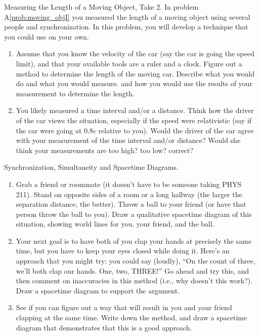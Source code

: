 \begin{aproblem}{Measuring the Length of a Moving Object, Take 2.}
  In problem A\ref{prob:moving_objI} you measured the length of a
  moving object using several people and synchronization.  In this
  problem, you will develop a technique that you could use on your
  own.
  \begin{enumerate}
  \item Assume that you know the velocity of the car (say the car is
    going the speed limit), and that your available tools are a ruler
    and a clock.  Figure out a method to determine the length of the
    moving car.  Describe what you would do and what you would
    measure. and how you would use the results of your measurement to
    determine the length.

  \item You likely measured a time interval and/or a distance.  Think
    how the driver of the car views the situation, especially if the
    speed were relativistic (say if the car were going at $0.8c$
    relative to you).  Would the driver of the car agree with your
    measurement of the time interval and/or distance?  Would she think
    your measurements are too high?  too low?  correct?

  \end{enumerate}
\end{aproblem}

\begin{aproblem}{Synchronization, Simultaneity and Spacetime Diagrams.}
  \begin{enumerate}
  \item Grab a friend or roommate (it doesn't have to be someone
    taking PHYS 211).  Stand on opposite sides of a room or a long
    hallway (the larger the separation distance, the better).  Throw a
    ball to your friend (or have that person throw the ball to you).
    Draw a qualitative spacetime diagram of this situation, showing
    world lines for you, your friend, and the ball.

  \item Your next goal is to have both of you clap your hands at
    precisely the same time, but you have to keep your eyes closed
    while doing it.  Here's an approach that you might try: you could
    say (loudly), ``On the count of three, we'll both clap our hands.
    One, two, THREE!''  Go ahead and try this, and then comment on
    inaccuracies in this method (i.e., why doesn't this work?).  Draw
    a spacetime diagram to support the argument.

  \item See if you can figure out a way that will result in you and
    your friend clapping at the same time.  Write down the method, and
    draw a spacetime diagram that demonstrates that this is a good
    approach.
  \end{enumerate}
\label{prob:synchronizeA}
\end{aproblem}


